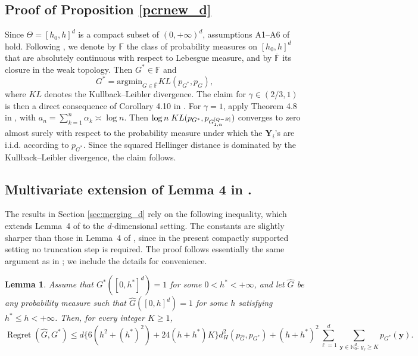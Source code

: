 \documentclass[twoside,12pt]{article}
\newtheorem{lem}[thm]{Lemma}
\begin{document}
\subsection{Proof of Proposition \ref{pcrnew_d}}\label{proof:pcrnew_d}


Since $\Theta=[h_0,h]^d$ is a compact subset of $(0,+\infty)^d$, assumptions A1--A6 of \cite{MarTok(09)} hold. Following \cite{MarTok(09)}, we denote by $\mathbb F$ the class of probability measures on $[h_0,h]^d$ that are absolutely continuous with respect to Lebesgue measure, and by $\overline{\mathbb F}$ its closure in the weak topology. Then $G^*\in\mathbb F$ and
$$
G^\ast=\text{argmin}_{G\in \overline {\mathbb F}}KL(p_{G^\ast},p_G),
$$
where $KL$ denotes the Kullback--Leibler divergence. The claim for $\gamma\in (2/3,1)$ is then a direct consequence of Corollary 4.10 in \cite{MarTok(09)}. For $\gamma=1$, apply Theorem 4.8 in \cite{MarTok(09)}, with $a_n=\sum_{k=1}^n\alpha_k\asymp \log n$. Then
$\log n \;KL(p_{G^\ast},p_{G_{1,n}^{\tiny{[Q-B]}}} )$ converges to zero almost surely with respect to the probability measure under which the $\boldsymbol{Y}_i$'s are i.i.d. according to $p_{G^\ast}$. Since the squared Hellinger distance is dominated by the Kullback--Leibler divergence, the claim follows.




\subsection{Multivariate extension of Lemma 4 in \cite{Jan(24)}.}\label{dextension_jana}

The results in Section \ref{sec:merging_d} rely on the following
inequality, which extends Lemma~4 of \cite{Jan(24)} to the $d$-dimensional
setting. The constants are slightly sharper than those in Lemma~4 of
\cite{Jan(24)}, since in the present compactly supported setting no
truncation step is required. The proof follows essentially the
same argument as in \cite{Jan(24)}; we include the details for convenience.



\begin{lem}
\label{lem:regret-density-d}
Assume that $G^\ast([0,h^\ast]^d)=1$ for some $0<h^\ast<+\infty$,
and let $\widehat G$ be any probability measure such that
$\widehat G([0,h]^d)=1$ for some $h$ satisfying
$h^\ast\leq h<+\infty$. Then, for every integer $K\geq 1$,
\[
\operatorname{Regret}(\widehat G,G^\ast)
\leq
d\Big\{
6(h^2+(h^\ast)^2)+24(h+h^\ast)K
\Big\}
d_H^2(p_{\widehat G},p_{G^\ast})
+
(h+h^\ast)^2
\sum_{\ell=1}^d
\sum_{\boldsymbol y\in\mathbb N_0^d:\,y_\ell\geq K}
p_{G^\ast}(\boldsymbol y).
\]
\end{lem}
\end{document}
